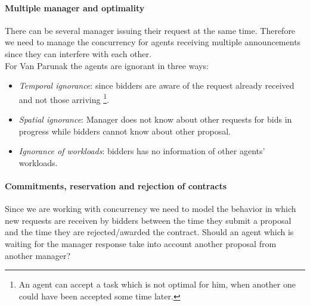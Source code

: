 \documentclass[10pt,a4paper]{article}
\begin{document}
\paragraph{Multiple manager and optimality}

There can be several manager issuing their request at the same time. Therefore we need to manage the concurrency for agents receiving multiple announcements since they can interfere with each other.\\
For Van Parunak the agents are ignorant in three ways:
\begin{itemize}
\item \textit{Temporal ignorance}: since bidders are aware of the request already received and not those arriving \footnote{An agent can accept a task which is not optimal for him, when another one could have been accepted some time later.}.
\item \textit{Spatial ignorance}: Manager does not know about other requests for bids in progress while bidders cannot know about other proposal. 
\item \textit{Ignorance of workloads}: bidders has no information of other agents' workloads.
\end{itemize}



\paragraph{Commitments, reservation and rejection of contracts}

Since we are working with concurrency we need to model the behavior in which new requests are receiven by bidders between the time they submit a proposal and the time they are rejected/awarded the contract. Should an agent which is waiting for the manager response take into account another proposal from another manager?
\end{document}
